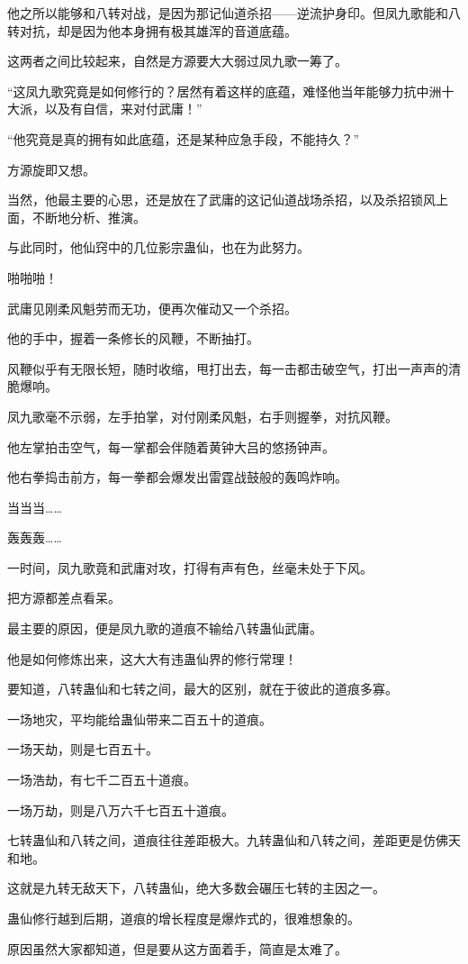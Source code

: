 \begin{this_body}
他之所以能够和八转对战，是因为那记仙道杀招——逆流护身印。但凤九歌能和八转对抗，却是因为他本身拥有极其雄浑的音道底蕴。

这两者之间比较起来，自然是方源要大大弱过凤九歌一筹了。

“这凤九歌究竟是如何修行的？居然有着这样的底蕴，难怪他当年能够力抗中洲十大派，以及有自信，来对付武庸！”

“他究竟是真的拥有如此底蕴，还是某种应急手段，不能持久？”

方源旋即又想。

当然，他最主要的心思，还是放在了武庸的这记仙道战场杀招，以及杀招锁风上面，不断地分析、推演。

与此同时，他仙窍中的几位影宗蛊仙，也在为此努力。

啪啪啪！

武庸见刚柔风魁劳而无功，便再次催动又一个杀招。

他的手中，握着一条修长的风鞭，不断抽打。

风鞭似乎有无限长短，随时收缩，甩打出去，每一击都击破空气，打出一声声的清脆爆响。

凤九歌毫不示弱，左手拍掌，对付刚柔风魁，右手则握拳，对抗风鞭。

他左掌拍击空气，每一掌都会伴随着黄钟大吕的悠扬钟声。

他右拳捣击前方，每一拳都会爆发出雷霆战鼓般的轰鸣炸响。

当当当……

轰轰轰……

一时间，凤九歌竟和武庸对攻，打得有声有色，丝毫未处于下风。

把方源都差点看呆。

最主要的原因，便是凤九歌的道痕不输给八转蛊仙武庸。

他是如何修炼出来，这大大有违蛊仙界的修行常理！

要知道，八转蛊仙和七转之间，最大的区别，就在于彼此的道痕多寡。

一场地灾，平均能给蛊仙带来二百五十的道痕。

一场天劫，则是七百五十。

一场浩劫，有七千二百五十道痕。

一场万劫，则是八万六千七百五十道痕。

七转蛊仙和八转之间，道痕往往差距极大。九转蛊仙和八转之间，差距更是仿佛天和地。

这就是九转无敌天下，八转蛊仙，绝大多数会碾压七转的主因之一。

蛊仙修行越到后期，道痕的增长程度是爆炸式的，很难想象的。

原因虽然大家都知道，但是要从这方面着手，简直是太难了。


\end{this_body}
